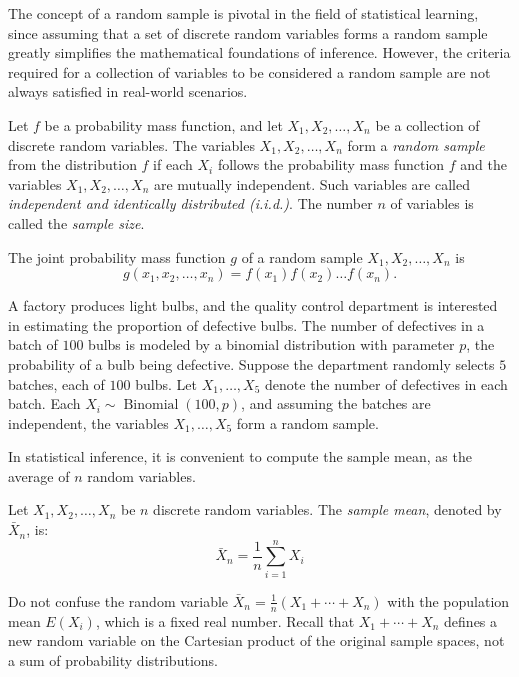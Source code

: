 The concept of a random sample is pivotal in the field of statistical learning, since assuming that a set of discrete random variables forms a random sample greatly simplifies the mathematical foundations of inference. However, the criteria required for a collection of variables to be considered a random sample are not always satisfied in real-world scenarios.

\begin{definition}
Let $f$ be a probability mass function, and let $X_1, X_2, \ldots, X_n$ be a collection of discrete random variables. The variables $X_1, X_2, \ldots, X_n$ form a \emph{random sample} from the distribution $f$ if each $X_i$ follows the probability mass function $f$ and the variables $X_1, X_2, \ldots, X_n$ are mutually independent. Such variables are called \emph{independent and identically distributed (i.i.d.)}. The number $n$ of variables is called the \emph{sample size}.
\end{definition}

The joint probability mass function $g$ of a random sample $X_1, X_2, \ldots, X_n$ is
\[
g(x_1, x_2, \ldots, x_n) = f(x_1) f(x_2) \ldots f(x_n).
\]

\begin{example}
A factory produces light bulbs, and the quality control department is interested in estimating the proportion of defective bulbs. The number of defectives in a batch of $100$ bulbs is modeled by a binomial distribution with parameter $p$, the probability of a bulb being defective. Suppose the department randomly selects $5$ batches, each of $100$ bulbs. Let $X_1, \ldots, X_5$ denote the number of defectives in each batch. Each $X_i \sim \operatorname{Binomial}(100,p)$, and assuming the batches are independent, the variables $X_1, \ldots, X_5$ form a random sample.
\end{example}

In statistical inference, it is convenient to compute the sample mean, as the average of $n$ random variables.

\begin{definition}
Let $X_1, X_2, \ldots, X_n$ be $n$ discrete random variables. The \emph{sample mean}, denoted by $\bar{X}_n$, is:
\[
\bar{X}_n = \frac{1}{n} \sum_{i=1}^n X_i
\]
\end{definition}

Do not confuse the random variable $\bar{X}_n = \tfrac{1}{n}(X_1 + \cdots + X_n)$ with the population mean $E(X_i)$, which is a fixed real number. Recall that $X_1 + \cdots + X_n$ defines a new random variable on the Cartesian product of the original sample spaces, not a sum of probability distributions.


